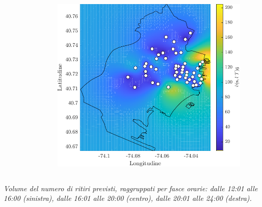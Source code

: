\begin{frame}
\begin{columns}
\begin{column}{0.33\linewidth}
\begin{figure}
			\end{figure}
		\end{column}
		\begin{column}{0.33\linewidth}
			\centering
			\begin{figure}
				\includegraphics[width=\textwidth]{../Tesi/Immagini/4. Caso di studio/Kriging/Mappa volume, 6}
			\end{figure}
		\end{column}
	\end{columns}
	\vspace{10pt}
	\textit{Volume del numero di ritiri previsti, raggruppati per fasce orarie: dalle 12:01 alle 16:00 (sinistra), dalle 16:01 alle 20:00 (centro), dalle 20:01 alle 24:00 (destra).}
\end{frame}
